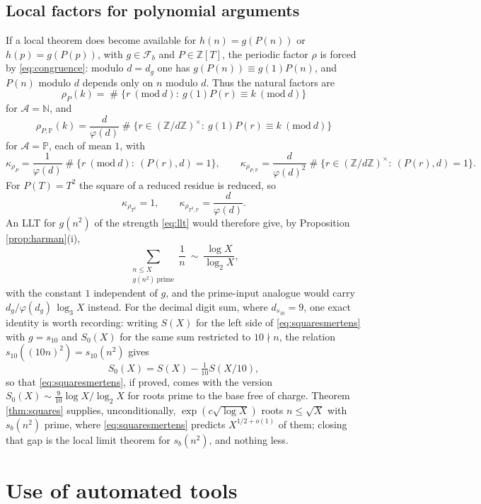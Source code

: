 \documentclass[11pt,reqno]{amsart}
\theoremstyle{plain}
\theoremstyle{definition}
\newcommand{\N}{\mathbb{N}}
\newcommand{\Z}{\mathbb{Z}}
\DeclareMathOperator{\Card}{\#}
\begin{document}
\subsection{Local factors for polynomial arguments}
If a local theorem does become available for $h(n)=g(P(n))$ or $h(p)=g(P(p))$, with $g\in\mathcal F_b$ and $P\in\Z[T]$, the periodic factor $\rho$ is forced by \eqref{eq:congruence}: modulo $d=d_g$ one has $g(P(n))\equiv g(1)P(n)$, and $P(n)$ modulo $d$ depends only on $n$ modulo $d$. Thus the natural factors are
\[
\rho_P(k)=\Card\{r\ (\mathrm{mod}\ d):\ g(1)P(r)\equiv k\ (\mathrm{mod}\ d)\}
\]
for $\mathcal A=\N$, and
\[
\rho_{P,\mathbb P}(k)=\frac d{\varphi(d)}\Card\{r\in(\Z/d\Z)^{\times}:\ g(1)P(r)\equiv k\ (\mathrm{mod}\ d)\}
\]
for $\mathcal A=\mathbb P$, each of mean $1$, with
\[
\kappa_{\rho_P}=\frac1{\varphi(d)}\Card\{r\ (\mathrm{mod}\ d):\ (P(r),d)=1\},
\qquad
\kappa_{\rho_{P,\mathbb P}}=\frac d{\varphi(d)^{2}}\Card\{r\in(\Z/d\Z)^{\times}:\ (P(r),d)=1\}.
\]
For $P(T)=T^{2}$ the square of a reduced residue is reduced, so
\[
\kappa_{\rho_{T^{2}}}=1,\qquad \kappa_{\rho_{T^{2},\mathbb P}}=\frac{d}{\varphi(d)} .
\]
An LLT for $g(n^{2})$ of the strength \eqref{eq:llt} would therefore give, by Proposition \ref{prop:harman}(i),
\begin{equation}\label{eq:squaresmertens}
\sum_{\substack{n\le X\\ g(n^{2})\ \text{prime}}}\frac1n\ \sim\ \frac{\log X}{\log_2X},
\end{equation}
with the constant $1$ independent of $g$, and the prime-input analogue would carry $d_g/\varphi(d_g)\,\log_3X$ instead. For the decimal digit sum, where $d_{s_{10}}=9$, one exact identity is worth recording: writing $S(X)$ for the left side of \eqref{eq:squaresmertens} with $g=s_{10}$ and $S_0(X)$ for the same sum restricted to $10\nmid n$, the relation $s_{10}((10n)^{2})=s_{10}(n^{2})$ gives
\[
S_0(X)=S(X)-\tfrac1{10}S(X/10),
\]
so that \eqref{eq:squaresmertens}, if proved, comes with the version $S_0(X)\sim\tfrac9{10}\log X/\log_2X$ for roots prime to the base free of charge. Theorem \ref{thm:squares} supplies, unconditionally, $\exp(c\sqrt{\log X})$ roots $n\le\sqrt X$ with $s_b(n^{2})$ prime, where \eqref{eq:squaresmertens} predicts $X^{1/2+o(1)}$ of them; closing that gap is the local limit theorem for $s_b(n^{2})$, and nothing less.

\section*{Use of automated tools}
\end{document}
